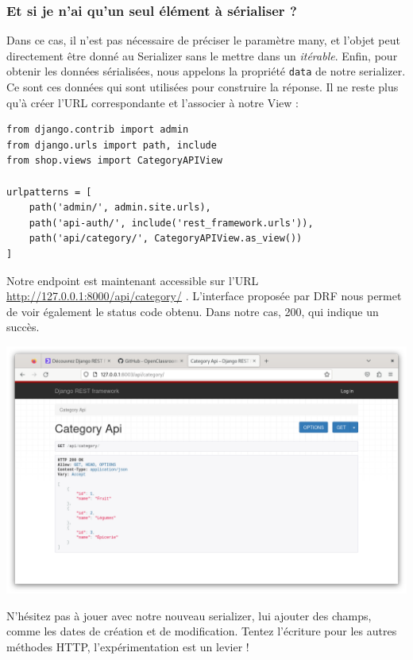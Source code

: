 \documentclass[a4paper]{article}
\begin{document}
\subsubsection*{Et si je n’ai qu’un seul élément à sérialiser ?}
Dans ce cas, il n’est pas nécessaire de préciser le paramètre  {\color{monOrange}many}, et l’objet peut directement être donné au {\color{monOrange}Serializer} sans le mettre dans un {\em itérable}. Enfin, pour obtenir les données sérialisées, nous appelons la propriété  {\tt data}  de notre serializer. Ce sont ces données qui sont utilisées pour construire la réponse. Il ne reste plus qu’à créer l’{\color{monOrange}URL} correspondante et l’associer à notre {\color{monOrange}View} :
\begin{verbatim}
from django.contrib import admin
from django.urls import path, include
from shop.views import CategoryAPIView
 
urlpatterns = [
    path('admin/', admin.site.urls),
    path('api-auth/', include('rest_framework.urls')),
    path('api/category/', CategoryAPIView.as_view())
]
\end{verbatim}
Notre endpoint est maintenant accessible sur l’URL \url{http://127.0.0.1:8000/api/category/} . L’interface proposée par {\color{monOrange}DRF} nous permet de voir également le status code obtenu. Dans notre cas, 200, qui indique un succès. 
\begin{center}
\includegraphics[width=15cm]{images/image05.png}
\end{center}

N’hésitez pas à jouer avec notre nouveau serializer, lui ajouter des champs, comme les dates de création et de modification. Tentez l’écriture pour les autres méthodes HTTP, l’expérimentation est un levier !
\end{document}
